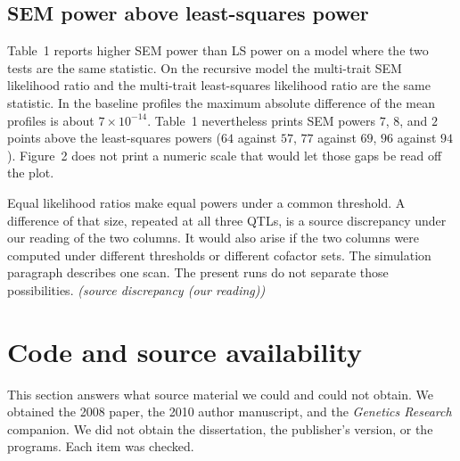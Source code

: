 \documentclass[11pt]{article}
\newcommand{\ev}[1]{\textup{\emph{(#1)}}}
\begin{document}
\subsection{SEM power above least-squares power}
\label{sec:semls}

Table~1 reports higher SEM power than LS power on a model where the two
tests are the same statistic. On the recursive model the multi-trait SEM likelihood ratio and the
multi-trait least-squares likelihood ratio are the same statistic. In the
baseline profiles the maximum absolute difference of the mean profiles is
about $7\times 10^{-14}$. Table~1 nevertheless prints SEM powers $7$, $8$,
and $2$ points above the least-squares powers ($64$ against $57$, $77$
against $69$, $96$ against $94$). Figure~2 does not print a numeric scale
that would let those gaps be read off the plot.

Equal likelihood ratios make equal powers under a common threshold. A
difference of that size, repeated at all three QTLs, is a source discrepancy
under our reading of the two columns. It would also arise if the two columns
were computed under different thresholds or different cofactor sets. The
simulation paragraph describes one scan. The present runs do not separate
those possibilities. \ev{source discrepancy (our reading)}

\section{Code and source availability}
\label{sec:availability}

This section answers what source material we could and could not obtain.
We obtained the 2008 paper, the 2010 author manuscript, and the
\emph{Genetics Research} companion. We did not obtain the dissertation, the
publisher's version, or the programs. Each item was checked.
\end{document}
